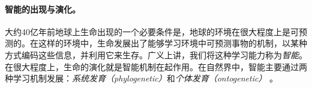 \documentclass[../../book-main.tex]{subfiles}
\begin{document}
\paragraph{智能的出现与演化。}

大约40亿年前地球上生命出现的一个必要条件是，地球的环境在很大程度上是可预测的。在这样的环境中，生命发展出了能够学习环境中可预测事物的机制，以某种方式编码这些信息，并利用它来生存。广义上讲，我们将这种学习能力称为{\em 智能}。在很大程度上，生命的演化就是智能机制在起作用。在自然界中，智能主要通过两种学习机制发展：{\em 系统发育（phylogenetic）}和{\em 个体发育（ontogenetic）} \cite{Wiener-Cybernetics-1961}。%
\end{document}
